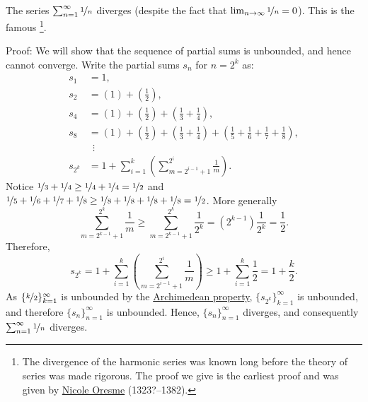 \begin{example} \label{example:harmonicseries}
The series $\sum_{n=1}^\infty \nicefrac{1}{n}$ diverges (despite the fact that
$\lim_{n\to\infty} \nicefrac{1}{n} = 0$).
This is the famous \emph{}%
\footnote{The divergence of the harmonic series was known 
long before the theory of series was made rigorous.  The proof we
give is the earliest proof and was given by
\href{https://en.wikipedia.org/wiki/Oresme}{Nicole Oresme}
(1323?--1382).}.

Proof: We will show that the sequence of partial sums is unbounded, and hence
cannot converge.
Write the partial sums $s_n$ for $n = 2^k$ as:
\begin{align*}
 s_1 & = 1 , \\
 s_2 & = \left( 1 \right) + \left( \frac{1}{2} \right) , \\
 s_4 & = \left( 1 \right) + \left( \frac{1}{2} \right) +
        \left( \frac{1}{3} + \frac{1}{4} \right) , \\
 s_8 & = \left( 1 \right) + \left( \frac{1}{2} \right) +
        \left( \frac{1}{3} + \frac{1}{4} \right) +
        \left( \frac{1}{5} + \frac{1}{6} + \frac{1}{7} + \frac{1}{8} \right) , \\
& ~~ \vdots \\
 s_{2^k} & = 
1 + 
\sum_{i=1}^k
\left(
\sum_{m=2^{i-1}+1}^{2^i} \frac{1}{m}
\right) .
\end{align*}
Notice $\nicefrac{1}{3} + \nicefrac{1}{4} \geq \nicefrac{1}{4} + \nicefrac{1}{4} =
\nicefrac{1}{2}$ and
$\nicefrac{1}{5} + \nicefrac{1}{6} + \nicefrac{1}{7} + \nicefrac{1}{8}
\geq \nicefrac{1}{8} + \nicefrac{1}{8} + \nicefrac{1}{8} + \nicefrac{1}{8} =
\nicefrac{1}{2}$.  More generally
\begin{equation*}
\sum_{m=2^{k-1}+1}^{2^k} \frac{1}{m}
\geq
\sum_{m=2^{k-1}+1}^{2^k} \frac{1}{2^k}
=
(2^{k-1}) \frac{1}{2^k} = \frac{1}{2} .
\end{equation*}
Therefore,
\begin{equation*}
s_{2^k} = 
1 + 
\sum_{i=1}^k
\left(
\sum_{m=2^{i-1}+1}^{2^i} \frac{1}{m}
\right) 
\geq
1 + \sum_{i=1}^k \frac{1}{2} = 1 + \frac{k}{2} .
\end{equation*}
As $\{ \nicefrac{k}{2} \}_{k=1}^\infty$ is unbounded by the
\hyperref[thm:arch:i]{Archimedean property},
$\{ s_{2^k} \}_{k=1}^\infty$ is unbounded,
and therefore $\{ s_n \}_{n=1}^\infty$ is unbounded.
Hence, $\{ s_n \}_{n=1}^\infty$ diverges, and consequently $\sum_{n=1}^\infty \nicefrac{1}{n}$ diverges.
\end{example}

